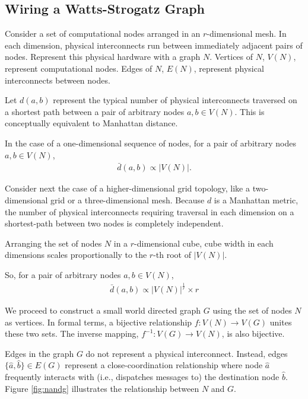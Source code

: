 \subsection{Wiring a Watts-Strogatz Graph} \label{sec:proof4}

Consider a set of computational nodes arranged in an $r$-dimensional mesh.
In each dimension, physical interconnects run between immediately adjacent pairs of nodes.
Represent this physical hardware with a graph $N$.
Vertices of $N$, $V(N)$, represent computational nodes.
Edges of $N$, $E(N)$, represent physical interconnects between nodes.

Let $d(a,b)$ represent the typical number of physical interconnects traversed on a shortest path between a pair of arbitrary nodes $a, b \in V(N)$.
This is conceptually equivalent to Manhattan distance.

In the case of a one-dimensional sequence of nodes, for a pair of arbitrary nodes $a,b \in V(N)$,
\begin{align*}
\bar{d}(a,b) \propto |V(N)|.
\end{align*}

Consider next the case of a higher-dimensional grid topology, like a two-dimensional grid or a three-dimensional mesh.
Because $d$ is a Manhattan metric, the number of physical interconnects requiring traversal in each dimension on a shortest-path between two nodes is completely independent.

Arranging the set of nodes $N$ in a $r$-dimensional cube, cube width in each dimensions scales proportionally to the $r$-th root of $|V(N)|$.

So, for a pair of arbitrary nodes $a,b \in V(N)$,
\begin{align} \label{eqn:mesh_prop}
\bar{d}(a, b) \propto |V(N)|^{\frac{1}{r}} \times r
\end{align}

We proceed to construct a small world directed graph $G$ using the set of nodes $N$ as vertices.
In formal terms, a bijective relationship $f: V(N) \rightarrow V(G)$ unites these two sets.
The inverse mapping, $f^{-1}: V(G) \rightarrow V(N)$, is also bijective.



Edges in the graph $G$ do not represent a physical interconnect.
Instead, edges $\{\hat{a}, \hat{b}\} \in E(G)$ represent a close-coordination relationship where node $\hat{a}$ frequently interacts with (i.e., dispatches messages to) the destination node $\hat{b}$.
Figure \ref{fig:nandg} illustrates the relationship between $N$ and $G$.


